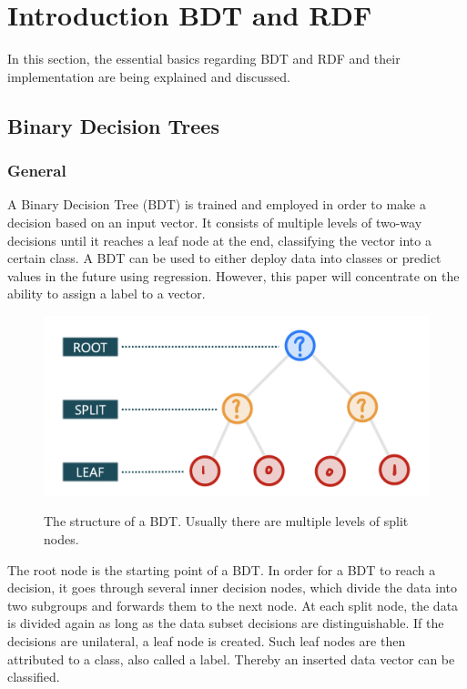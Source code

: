 \documentclass[
12pt,
headsepline,
bibliography=totoc,
twoside=semi,
fleqn
]{scrartcl}
\begin{document}
\newpage

\section{Introduction BDT and RDF\label{sec:sec2}}
In this section, the essential basics regarding BDT and RDF and their implementation are being explained and discussed.

 \subsection{Binary Decision Trees\label{sec:sec2-1}}

 \subsubsection{General\label{sec:sec2-1-1}}
 A Binary Decision Tree (BDT) is trained and employed in order to make a decision based on an input vector. It consists of multiple levels of two-way decisions until it reaches a leaf node at the end, classifying the vector into a certain class. A BDT can be used to either deploy data into classes or predict values in the future using regression. However, this paper will concentrate on the ability to assign a label to a vector. 

 \begin{figure}[H]
 \centering \includegraphics[scale=0.55]{BDT1.png}\label{fig:fig1}
 \caption{The structure of a BDT. Usually there are multiple levels of split nodes.}
 \end{figure}

 The root node is the starting point of a BDT. In order for a BDT to reach a decision, it goes through several inner decision nodes, which divide the data into two subgroups and forwards them to the next node. At each split node, the data is divided again as long as the data subset decisions are distinguishable. If the decisions are unilateral, a leaf node is created. Such leaf nodes are then attributed to a class, also called a label. Thereby an inserted data vector can be classified. 
\end{document}
